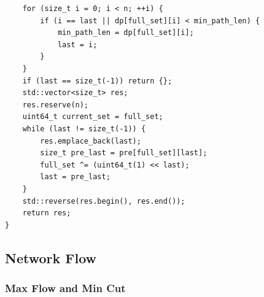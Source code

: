 \documentclass[UTF8]{article}
\begin{document}
\begin{verbatim}
	for (size_t i = 0; i < n; ++i) {
		if (i == last || dp[full_set][i] < min_path_len) {
			min_path_len = dp[full_set][i];
			last = i;
		}
	}
	if (last == size_t(-1)) return {};
	std::vector<size_t> res;
	res.reserve(n);
	uint64_t current_set = full_set;
	while (last != size_t(-1)) {
		res.emplace_back(last);
		size_t pre_last = pre[full_set][last];
		full_set ^= (uint64_t(1) << last);
		last = pre_last;
	}
	std::reverse(res.begin(), res.end());
	return res;
}
\end{verbatim}

\subsection{Network Flow}
\subsubsection{Max Flow and Min Cut}
\end{document}

